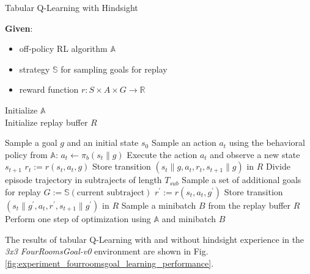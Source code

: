 \documentclass[conference]{IEEEtran}
\begin{document}
\begin{algorithm}
\caption{Tabular Q-Learning with Hindsight}
\label{alg:qtab_her}
\textbf{Given}:
\begin{itemize}
    \item off-policy RL algorithm $\mathbb{A}$
    \item strategy $\mathbb{S}$ for sampling goals for replay
    \item reward function $r: S \times A \times G \to \mathbb{R}$
\end{itemize}
Initialize $\mathbb{A}$ \\
Initialize replay buffer $R$
\begin{algorithmic}
    \STATE Sample a goal $g$ and an initial state $s_0$
        \STATE Sample an action $a_t$ using the behavioral policy from $\mathbb{A}$: 
        \STATE \text{ }\text{ }\text{ }\text{ }$a_t \leftarrow \pi_b(s_{t}\|g)$
        \STATE Execute the action $a_t$ and observe a new state $s_{t+1}$
        \STATE $r_t := r(s_t,a_t,g)$
        \STATE Store transition $(s_t\|g, a_t, r_t, s_{t+1}\|g)$ in $R$
    \ENDFOR
    \STATE Divide episode trajectory in subtrajects of length $T_{sub}$
            \STATE Sample a set of additional goals for replay $G:=\mathbb{S}(\text{current subtraject})$
                \STATE $r^{\prime} := r(s_t,a_t,g^{\prime})$
                \STATE Store transition $(s_t\|g^{\prime}, a_t, r^{\prime}, s_{t+1}\|g^{\prime})$ in $R$
            \ENDFOR
        \ENDFOR
    \ENDFOR
        \STATE Sample a minibatch $B$ from the replay buffer $R$
        \STATE Perform one step of optimization using $\mathbb{A}$ and minibatch $B$
    \ENDFOR
\ENDFOR
\end{algorithmic}
\end{algorithm}

The results of tabular Q-Learning with and without hindsight experience in the \textit{3x3 FourRoomsGoal-v0} environment are shown in Fig. \ref{fig:experiment_fourroomsgoal_learning_performance}.
\end{document}
